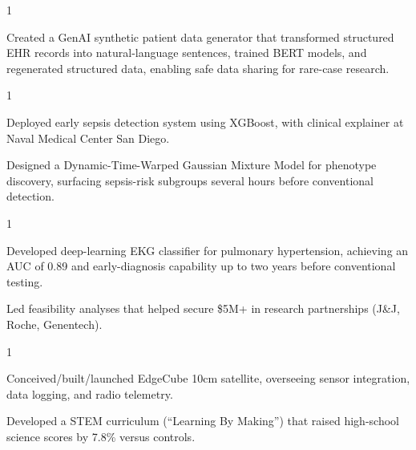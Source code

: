 \documentclass[letterpaper, 11pt]{cv}
\begin{document}
\begin{entryList}{1}
	\item Created a GenAI synthetic patient data generator that transformed structured EHR records into natural-language sentences, trained BERT models, and regenerated structured data, enabling safe data sharing for rare-case research.
\end{entryList}

\begin{entryList}{1}
    \item Deployed early sepsis detection system using XGBoost, with clinical explainer at Naval Medical Center San Diego.
    \item Designed a Dynamic-Time-Warped Gaussian Mixture Model for phenotype discovery, surfacing sepsis-risk subgroups several hours before conventional detection.
\end{entryList}

\begin{entryList}{1}
	\item Developed deep-learning EKG classifier for pulmonary hypertension, achieving an AUC of 0.89 and early-diagnosis capability up to two years before conventional testing.
	\item Led feasibility analyses that helped secure \$5M+ in research partnerships (J\&J, Roche, Genentech).
\end{entryList}

\begin{entryList}{1}
	\item Conceived/built/launched EdgeCube 10cm satellite, overseeing sensor integration, data logging, and radio telemetry.
	\item Developed a STEM curriculum (``Learning By Making'') that raised high-school science scores by 7.8\% versus controls.
\end{entryList}


\end{document}

